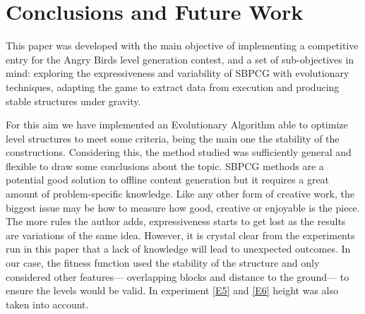 \documentclass[sigconf]{acmart}
\begin{document}
\section{Conclusions and Future Work} 
\label{sec:conclusions}


This paper was developed with the main objective of implementing a
competitive entry for the Angry Birds level generation contest, and  a
set of sub-objectives in mind: exploring the expressiveness and variability of 
SBPCG with evolutionary techniques, adapting the game to extract data from 
execution and producing stable structures under gravity.

For this aim we have implemented an Evolutionary Algorithm able to optimize 
level structures to meet some criteria, being the main one the stability of the 
constructions.
Considering this, the method studied was
sufficiently general and flexible to draw some conclusions about the
topic. SBPCG methods are a potential good solution to offline content
generation but it requires a great amount of problem-specific
knowledge. Like any other form of creative work, the biggest issue may
be how to measure how good, creative or enjoyable is the piece. The
more rules the author adds, expressiveness starts to get lost as the
results are variations of the same idea. However, it is crystal clear
from the experiments run in this paper that a lack of knowledge
will lead to unexpected outcomes.
In our case, the fitness function used the 
stability of the structure and only considered other features--- overlapping 
blocks and distance to the ground--- to ensure the levels would be valid.
In experiment \ref{E5} and \ref{E6} height was also taken into account.
\end{document}
